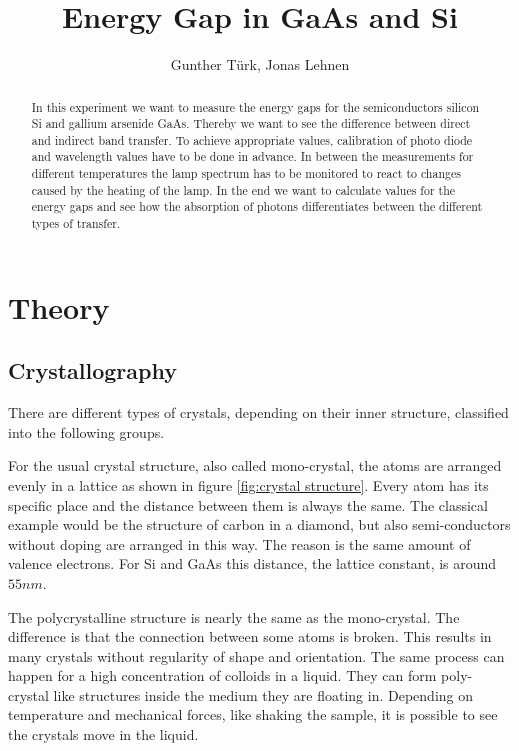 \documentclass[]{article}
\title{Energy Gap in GaAs and Si}
\author{Gunther T\"urk, Jonas Lehnen}
\begin{document}
\maketitle
\begin{abstract}
In this experiment we want to measure the energy gaps for the semiconductors silicon Si and gallium arsenide GaAs. Thereby we want to see the difference between direct and indirect band transfer. To achieve appropriate values, calibration of photo diode and wavelength values have to be done in advance. In between the measurements for different temperatures the lamp spectrum has to be monitored to react to changes caused by the heating of the lamp. In the end we want to calculate values for the energy gaps and see how the absorption of photons differentiates between the different types of transfer.

\end{abstract}

\tableofcontents

\newpage
\section{Theory}
\subsection{Crystallography}
There are different types of crystals, depending on their inner structure, classified into the following groups. 

For the usual crystal structure, also called mono-crystal, the atoms are arranged evenly in a lattice as shown in figure \ref{fig:crystal structure}. Every atom has its specific place and the distance between them is always the same. The classical example would be the structure of carbon in a diamond, but also semi-conductors without doping are arranged in this way. The reason is the same amount of valence electrons. For Si and GaAs this distance, the lattice constant, is around $55nm$.

The polycrystalline structure is nearly the same as the mono-crystal. The difference is that the connection between some atoms is broken. This results in many crystals without regularity of shape and orientation. The same process can happen for a high concentration of colloids in a liquid. They can form poly-crystal like structures inside the medium they are floating in. Depending on temperature and mechanical forces, like shaking the sample, it is possible to see the crystals move in the liquid.
\end{document}
